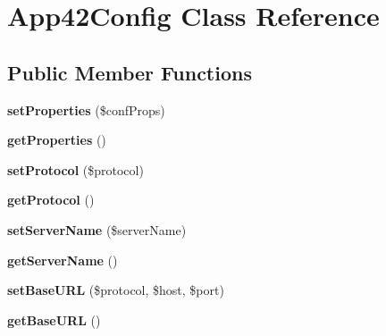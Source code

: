 \hypertarget{class_app42_config}{\section{App42\+Config Class Reference}
\label{class_app42_config}
}
\subsection*{Public Member Functions}
\begin{DoxyCompactItemize}
\item 
\hypertarget{class_app42_config_a6da9cfa34e711012af867bde3e369eef}{{\bfseries set\+Properties} (\$conf\+Props)}\label{class_app42_config_a6da9cfa34e711012af867bde3e369eef}

\item 
\hypertarget{class_app42_config_ad92c14b6c86304d3f1fb86b2936d3408}{{\bfseries get\+Properties} ()}\label{class_app42_config_ad92c14b6c86304d3f1fb86b2936d3408}

\item 
\hypertarget{class_app42_config_ae2238ca228e0bb56ca0ae233893c0b91}{{\bfseries set\+Protocol} (\$protocol)}\label{class_app42_config_ae2238ca228e0bb56ca0ae233893c0b91}

\item 
\hypertarget{class_app42_config_ab2caee71cf780f7242c4a5c0261f2b97}{{\bfseries get\+Protocol} ()}\label{class_app42_config_ab2caee71cf780f7242c4a5c0261f2b97}

\item 
\hypertarget{class_app42_config_a146501775d8513fd0633992c7ac86d86}{{\bfseries set\+Server\+Name} (\$server\+Name)}\label{class_app42_config_a146501775d8513fd0633992c7ac86d86}

\item 
\hypertarget{class_app42_config_ae8e894c5cd9aeeb004efbd032fb1dfc9}{{\bfseries get\+Server\+Name} ()}\label{class_app42_config_ae8e894c5cd9aeeb004efbd032fb1dfc9}

\item 
\hypertarget{class_app42_config_a77e7c846f78f107e69cfc4f3da9432fc}{{\bfseries set\+Base\+U\+R\+L} (\$protocol, \$host, \$port)}\label{class_app42_config_a77e7c846f78f107e69cfc4f3da9432fc}

\item 
\hypertarget{class_app42_config_ae55da8dc3cff0839c2f0bab9082a33c3}{{\bfseries get\+Base\+U\+R\+L} ()}\label{class_app42_config_ae55da8dc3cff0839c2f0bab9082a33c3}


\end{DoxyCompactItemize}

